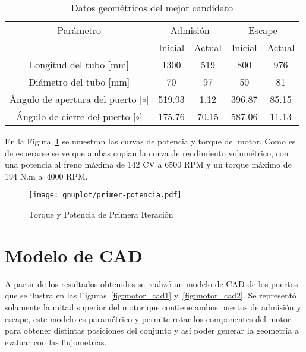 \begin{table}[h]
  \centering
  \begin{tabular}{ccccc}
    \toprule
    Parámetro & \multicolumn{2}{c}{Admisión} & \multicolumn{2}{c}{Escape} \\
    \cmidrule(lr){2-3} \cmidrule(lr){4-5}
    & Inicial & Actual & Inicial & Actual \\
    \midrule
    Longitud del tubo [mm] & 1300 & 519 & 800 & 976 \\
    Diámetro del tubo [mm] & 70 & 97 & 50 & 81 \\
    Ángulo de apertura del puerto [$\circ$] & 519.93 & 1.12 & 396.87 & 85.15 \\
    Ángulo de cierre del puerto [$\circ$] & 175.76 & 70.15 & 587.06 & 11.13 \\
    \bottomrule
  \end{tabular}
  \caption{Datos geométricos del mejor candidato}
  \label{tab:resultado_primer_it}
\end{table}


En la Figura~\ref{fig:PoTi_primer_op} se muestran las curvas de potencia y
torque del motor.
%
Como es de esperarse se ve que ambas copian la curva de rendimiento volumétrico,
con una potencia al freno máxima de 142 CV a 6500 RPM y un torque máximo de 194
N.m a\ 4000 RPM.

\begin{figure}[h!]
  \centering
  \texttt{[image: gnuplot/primer-potencia.pdf]}
  \caption{Torque y Potencia de Primera Iteración} \label{fig:PoTi_primer_op}
\end{figure}


\section{Modelo de CAD}
%
A partir de los resultados obtenidos se realizó un modelo de CAD de los puertos
que se ilustra en las Figuras~\ref{fig:motor_cad1} y~\ref{fig:motor_cad2}.
%
Se representó solamente la mitad superior del motor que contiene ambos puertos
de admisión y escape, este modelo es paramétrico y permite rotar los componentes
del motor para obtener distintas posiciones del conjunto y así poder generar la
geometría a evaluar con las flujometrías.


